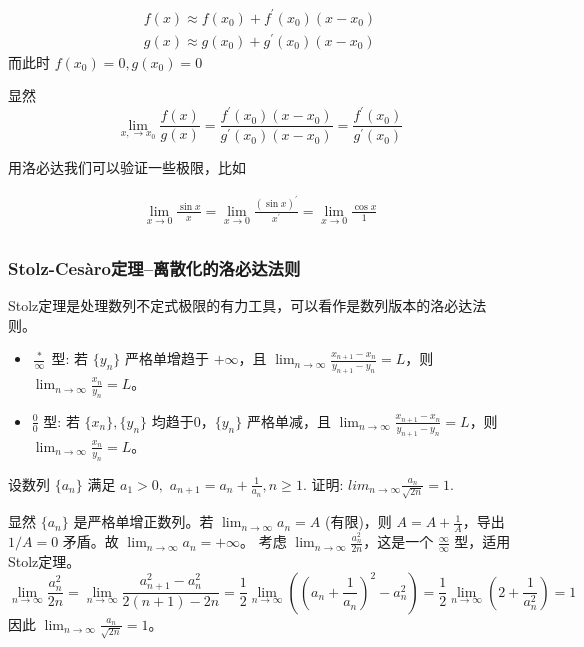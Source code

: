 \documentclass[lang=cn,newtx,10pt,scheme=chinese]{elegantbook}
\begin{document}
\begin{equation}
  \begin{aligned}
  f(x)\approx f(x_0)+f^{\prime }(x_0)(x-x_0) \\
  g(x)\approx g(x_0)+g^{\prime }(x_0)(x-x_0)
  \end{aligned}
\end{equation}
而此时 $f(x_0)=0,g(x_0)=0$

显然 
\begin{equation}
  \lim_{x,\to x_0} \frac{f(x)}{g(x)}=\frac{f^{\prime }(x_0)(x-x_0)}{g^{\prime }(x_0)(x-x_0)}=\frac{f^{\prime }(x_0)}{g^{\prime }(x_0)}
\end{equation}


用洛必达我们可以验证一些极限，比如

\begin{example}
  \begin{equation}
    \begin{aligned}
    \lim_{x \to 0} \frac{\sin x }{x}=\lim_{x \to 0} \frac{(\sin x)^{\prime }}{x^{\prime }}=\lim_{x \to 0} \frac{\cos x}{1} \\
    \end{aligned}
  \end{equation}
\end{example}

\subsubsection{Stolz-Cesàro定理--离散化的洛必达法则}
Stolz定理是处理数列不定式极限的有力工具，可以看作是数列版本的洛必达法则。
\begin{itemize}
    \item $\frac{*}{\infty}$ 型: 若 $\{y_n\}$ 严格单增趋于 $+\infty$，且 $\lim_{n\to\infty} \frac{x_{n+1}-x_n}{y_{n+1}-y_n} = L$，则 $\lim_{n\to\infty} \frac{x_n}{y_n} = L$。
    \item $\frac{0}{0}$ 型: 若 $\{x_n\}, \{y_n\}$ 均趋于0，$\{y_n\}$ 严格单减，且 $\lim_{n\to\infty} \frac{x_{n+1}-x_n}{y_{n+1}-y_n} = L$，则 $\lim_{n\to\infty} \frac{x_n}{y_n} = L$。
\end{itemize}
\begin{problem}[CMC真题]
 设数列 $\{a_{n}\}$ 满足 $a_{1}>0,$ $a_{n+1}=a_{n}+\frac{1}{a_{n}},n\ge1.$ 证明:
$lim_{n\rightarrow\infty}\frac{a_{n}}{\sqrt{2n}}=1.$
\end{problem}
\begin{solution}
    显然 $\{a_n\}$ 是严格单增正数列。若 $\lim_{n\to\infty} a_n = A$ (有限)，则 $A=A+\frac{1}{A}$，导出 $1/A=0$ 矛盾。故 $\lim_{n\to\infty} a_n = +\infty$。
    考虑 $\lim_{n\to\infty} \frac{a_n^2}{2n}$，这是一个 $\frac{\infty}{\infty}$ 型，适用Stolz定理。
    \begin{equation*}
        \lim_{n\to\infty} \frac{a_n^2}{2n} = \lim_{n\to\infty} \frac{a_{n+1}^2 - a_n^2}{2(n+1)-2n} = \frac{1}{2}\lim_{n\to\infty} \left( (a_n+\frac{1}{a_n})^2 - a_n^2 \right) = \frac{1}{2}\lim_{n\to\infty} (2 + \frac{1}{a_n^2}) = 1
    \end{equation*}
    因此 $\lim_{n\to\infty} \frac{a_n}{\sqrt{2n}} = 1$。
\end{solution}
\end{document}
